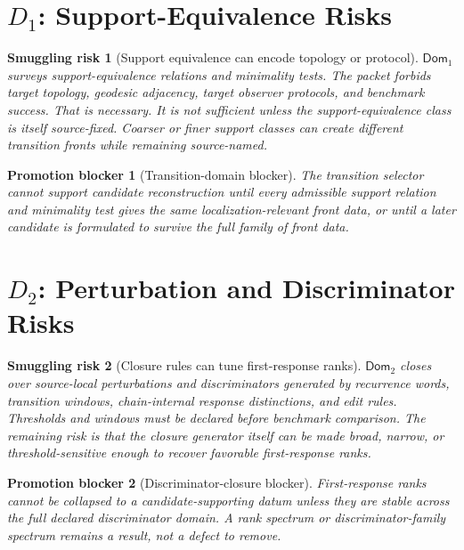 \documentclass[11pt]{article}
\newcommand{\Dom}{\mathsf{Dom}}
\newtheorem{smugglingrisk}{Smuggling risk}
\newtheorem{promotionblocker}{Promotion blocker}
\begin{document}
\section{\texorpdfstring{\(D_1\)}{D1}: Support-Equivalence Risks}

\begin{smugglingrisk}[Support equivalence can encode topology or protocol]
\(\Dom_1\) surveys support-equivalence relations and minimality tests. The
packet forbids target topology, geodesic adjacency, target observer protocols,
and benchmark success. That is necessary. It is not sufficient unless the
support-equivalence class is itself source-fixed. Coarser or finer support
classes can create different transition fronts while remaining source-named.
\end{smugglingrisk}

\begin{promotionblocker}[Transition-domain blocker]
The transition selector cannot support candidate reconstruction until every
admissible support relation and minimality test gives the same
localization-relevant front data, or until a later candidate is formulated to
survive the full family of front data.
\end{promotionblocker}

\section{\texorpdfstring{\(D_2\)}{D2}: Perturbation and Discriminator Risks}

\begin{smugglingrisk}[Closure rules can tune first-response ranks]
\(\Dom_2\) closes over source-local perturbations and discriminators generated
by recurrence words, transition windows, chain-internal response distinctions,
and edit rules. Thresholds and windows must be declared before benchmark
comparison. The remaining risk is that the closure generator itself can be
made broad, narrow, or threshold-sensitive enough to recover favorable
first-response ranks.
\end{smugglingrisk}

\begin{promotionblocker}[Discriminator-closure blocker]
First-response ranks cannot be collapsed to a candidate-supporting datum
unless they are stable across the full declared discriminator domain. A rank
spectrum or discriminator-family spectrum remains a result, not a defect to
remove.
\end{promotionblocker}
\end{document}
